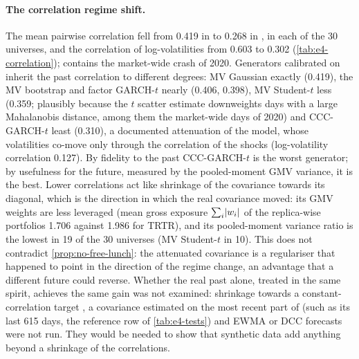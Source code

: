 \paragraph{The correlation regime shift.}
The mean pairwise correlation fell from 0.419 in \TRAIN{} to 0.268 in \TEST{}, in each of the 30
universes, and the correlation of log-volatilities from 0.603 to 0.302 (\cref{tab:e4-correlation});
\TRAIN{} contains the market-wide crash of 2020. Generators calibrated on \TRAIN{} inherit
the past correlation to different degrees: MV Gaussian exactly (0.419), the MV bootstrap and factor
GARCH-$t$ nearly (0.406, 0.398), MV Student-$t$ less (0.359; plausibly because the $t$ scatter
estimate downweights days with a large Mahalanobis distance, among them the market-wide days of
2020) and CCC-GARCH-$t$ least (0.310), a documented attenuation of the model, whose volatilities
co-move only through the correlation of the shocks (log-volatility correlation 0.127). By
fidelity to the past CCC-GARCH-$t$ is the worst generator; by usefulness for the future, measured
by the pooled-moment GMV variance, it is the best. Lower correlations act like shrinkage of the
covariance towards its diagonal, which is the direction in which the real covariance moved: its
GMV weights are less leveraged (mean gross exposure $\sum_i\lvert w_i\rvert$ of the replica-wise
portfolios 1.706 against 1.986 for TRTR), and its pooled-moment variance ratio is the lowest in 19
of the 30 universes (MV Student-$t$ in 10). This does not contradict \cref{prop:no-free-lunch}:
the attenuated covariance is a regulariser that happened to point in the direction of the regime
change, an advantage that a different future could reverse. Whether the real past alone, treated
in the same spirit, achieves the same gain was not examined: shrinkage towards a
constant-correlation target \citep{ledoit_2004_honey}, a covariance estimated on the most recent
part of \TRAIN{} (such as its last 615 days, the reference row of \cref{tab:e4-tests}) and EWMA or
DCC forecasts \citep{engle2002dynamic} were not run. They would be needed to show that synthetic
data add anything beyond a shrinkage of the correlations.

